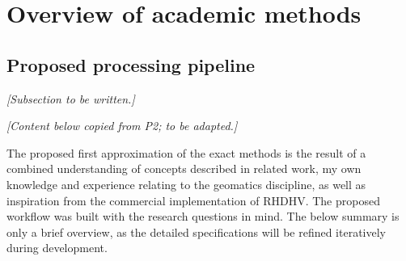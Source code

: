 \section{Overview of academic methods}
\label{sec:methodsoverview}

\subsection{Proposed processing pipeline}
\label{sub:pipelineoverview}

\textit{[Subsection to be written.]}

\textit{[Content below copied from P2; to be adapted.]}

The proposed first approximation of the exact methods is the result of a combined understanding of concepts described in related work, my own knowledge and experience relating to the geomatics discipline, as well as inspiration from the commercial implementation of RHDHV. The proposed workflow was built with the research questions in mind. The below summary is only a brief overview, as the detailed specifications will be refined iteratively during development.

